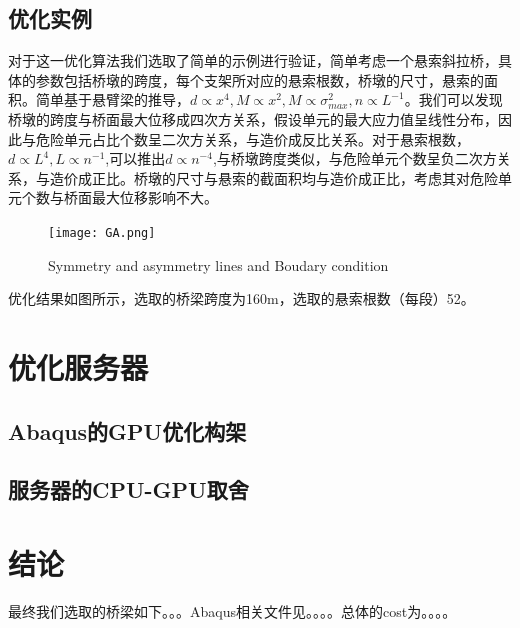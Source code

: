 \documentclass[forprint]{WHUBachelor}
\begin{document}
\section{优化实例}
对于这一优化算法我们选取了简单的示例进行验证，简单考虑一个悬索斜拉桥，具体的参数包括桥墩的跨度，每个支架所对应的悬索根数，桥墩的尺寸，悬索的面积。简单基于悬臂梁的推导，$d\propto x^4,M\propto x^2,M\propto \sigma_{max}^2,n \propto L^{-1}$。我们可以发现桥墩的跨度与桥面最大位移成四次方关系，假设单元的最大应力值呈线性分布，因此与危险单元占比个数呈二次方关系，与造价成反比关系。对于悬索根数，$d \propto L^4,L \propto n^{-1}$,可以推出$d \propto n^{-4}$,与桥墩跨度类似，与危险单元个数呈负二次方关系，与造价成正比。桥墩的尺寸与悬索的截面积均与造价成正比，考虑其对危险单元个数与桥面最大位移影响不大。
\begin{figure}[H]
\centering
    \texttt{[image: GA.png]}\hfill
  \caption{Symmetry and asymmetry lines and Boudary condition}
\label{fig:1}
\end{figure}
优化结果如图所示，选取的桥梁跨度为160m，选取的悬索根数（每段）52。
\chapter{优化服务器}
\section{Abaqus的GPU优化构架}
\section{服务器的CPU-GPU取舍}
\chapter{结论}
最终我们选取的桥梁如下。。。Abaqus相关文件见。。。。总体的cost为。。。。


\cleardoublepage
\end{document}
